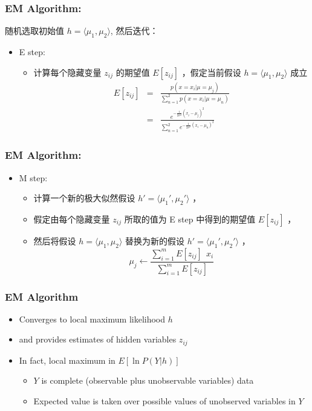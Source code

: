 \documentclass{beamer}
\begin{document}
\begin{frame}
\frametitle{EM Algorithm:}
\label{sec-9-4}

随机选取初始值 $h = \langle \mu_1, \mu_2 \rangle$, 然后迭代：
\begin{itemize}
\item E step:
\begin{itemize}
\item 计算每个隐藏变量 $z_{ij}$ 的期望值 $E[z_{ij}]$ ，假定当前假设 $h = \langle \mu_1, \mu_2 \rangle$ 成立
     \begin{eqnarray}
      E[z_{ij}] & = & \frac{p(x=x_i | \mu = \mu_j)}{\sum_{n=1}^{2} p(x = x_i | \mu=\mu_n)} \nonumber \\
      & = & \frac{e^{-\frac{1}{2 \sigma^2} (x_i -  \mu_j)^2}}{\sum_{n=1}^{2} e^{-\frac{1}{2 \sigma^2} (x_i - \mu_n)^2}} \nonumber
     \end{eqnarray}
\end{itemize}
\end{itemize}
\end{frame}
\begin{frame}
\frametitle{EM Algorithm:}
\label{sec-9-5}

\begin{itemize}
\item M step:
\begin{itemize}
\item 计算一个新的极大似然假设 $h' = \langle \mu_1', \mu_2' \rangle$ ，
\item 假定由每个隐藏变量 $z_{ij}$ 所取的值为 E step 中得到的期望值 $E[z_{ij}]$ ，
\item 然后将假设 $h =\langle \mu_1, \mu_2 \rangle$ 替换为新的假设 $h' = \langle \mu_1', \mu_2' \rangle$ ，
      $$\mu_j \leftarrow \frac{\sum_{i=1}^m E[z_{ij}] \ \  x_i}{\sum_{i=1}^m E[z_{ij}]}$$
\end{itemize}
\end{itemize}
\end{frame}
\begin{frame}
\frametitle{EM Algorithm}
\label{sec-9-6}


\begin{itemize}
\item Converges to local maximum likelihood $h$
\item and provides estimates of hidden variables $z_{ij}$
\item In fact, local maximum in $E[\ln P(Y|h)]$
\begin{itemize}
\item $Y$ is complete (observable plus unobservable variables) data
\item Expected value is taken over possible values of unobserved variables in $Y$
\end{itemize}
\end{itemize}
\end{frame}
\end{document}
